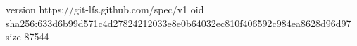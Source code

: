 version https://git-lfs.github.com/spec/v1
oid sha256:633d6b99d571c4d27824212033e8e0b64032ec810f406592c984ea8628d96d97
size 87544
